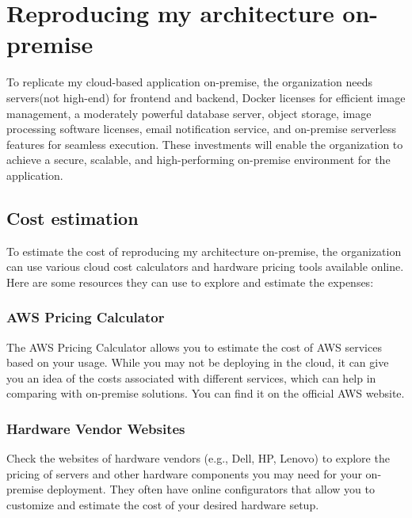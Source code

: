 
\newpage

\clearpage

\chapter{Reproducing my architecture on-premise}
To replicate my cloud-based application on-premise, the organization needs servers(not high-end) for frontend and backend, Docker licenses for efficient image management, a moderately powerful database server, object storage, image processing software licenses, email notification service, and on-premise serverless features for seamless execution. These investments will enable the organization to achieve a secure, scalable, and high-performing on-premise environment for the application.

\section{Cost estimation}
To estimate the cost of reproducing my architecture on-premise, the organization can use various cloud cost calculators and hardware pricing tools available online. Here are some resources they can use to explore and estimate the expenses:

\subsection{AWS Pricing Calculator}
The AWS Pricing Calculator allows you to estimate the cost of AWS services based on your usage. While you may not be deploying in the cloud, it can give you an idea of the costs associated with different services, which can help in comparing with on-premise solutions. You can find it on the official AWS website.


\subsection{Hardware Vendor Websites}
Check the websites of hardware vendors (e.g., Dell, HP, Lenovo) to explore the pricing of servers and other hardware components you may need for your on-premise deployment. They often have online configurators that allow you to customize and estimate the cost of your desired hardware setup.

